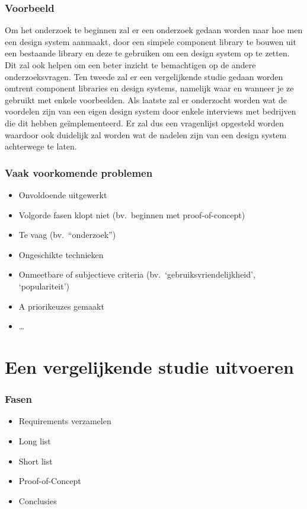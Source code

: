 \documentclass[aspectratio=169]{beamer}
\begin{document}
\begin{frame}
  \frametitle{Voorbeeld}

  \small

  Om het onderzoek te beginnen zal er een onderzoek gedaan worden naar hoe men een design system aanmaakt, door een simpele component library te bouwen uit een bestaande library en deze te gebruiken om een design system op te zetten. Dit zal ook helpen om een beter inzicht te bemachtigen op de andere onderzoeksvragen. Ten tweede zal er een vergelijkende studie gedaan worden omtrent component libraries en design systems, namelijk waar en wanneer je ze gebruikt met enkele voorbeelden. Als laatste zal er onderzocht worden wat de voordelen zijn van een eigen design system door enkele interviews met bedrijven die dit hebben geïmplementeerd. Er zal dus een vragenlijst opgesteld worden waardoor ook duidelijk zal worden wat de nadelen zijn van een design system achterwege te laten.

\end{frame}

\begin{frame}
  \frametitle{Vaak voorkomende problemen}

  \begin{itemize}
    \item Onvoldoende uitgewerkt
    \item Volgorde fasen klopt niet (bv.\ beginnen met proof-of-concept)
    \item Te vaag (bv.\ ``onderzoek'')
    \item Ongeschikte technieken
    \item Onmeetbare of subjectieve criteria (bv.\ `gebruiksvriendelijkheid', `populariteit')
    \item A priorikeuzes gemaakt
    \item \ldots
  \end{itemize}

\end{frame}

\section{Een vergelijkende studie uitvoeren}

\begin{frame}
  \frametitle{Fasen}


  \begin{itemize}
    \item Requirements verzamelen
    \item Long list
    \item Short list
    \item Proof-of-Concept
    \item Conclusies
  \end{itemize}

\end{frame}
\end{document}
